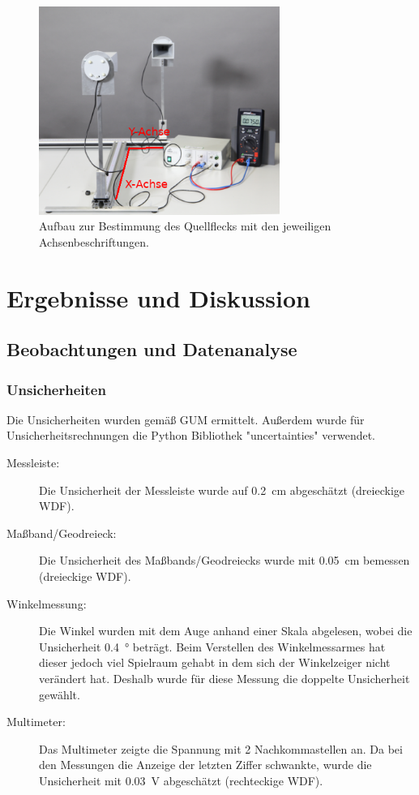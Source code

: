 \documentclass[
	a4paper,
	12pt,
	pagesize,
	ngerman
]{scrartcl}
\begin{document}
	\begin{figure}[H] 
		\includegraphics[width=0.7\textwidth]{MikrowellenMitAchsen}
		\centering
		\caption{Aufbau zur Bestimmung des Quellflecks mit den jeweiligen Achsenbeschriftungen.}
		\label{fig_mikrowellenmitachsen}
		\centering
	\end{figure}
	
	\section{Ergebnisse und Diskussion}
	

	\subsection{Beobachtungen und Datenanalyse}
	\subsubsection{Unsicherheiten} %
	Die Unsicherheiten wurden gemäß GUM ermittelt. 
	Außerdem wurde für Unsicherheitsrechnungen die Python Bibliothek "uncertainties" verwendet.
	\begin{description}
		\item[Messleiste:] Die Unsicherheit der Messleiste wurde auf \SI{0,2}{cm} abgeschätzt (dreieckige WDF).
		\item[Maßband/Geodreieck:] Die Unsicherheit des Maßbands/Geodreiecks wurde mit \SI{0,05}{cm} bemessen (dreieckige WDF).
		\item[Winkelmessung:]  Die Winkel wurden mit dem Auge anhand einer Skala abgelesen, wobei die Unsicherheit \SI{0,4}{\degree} beträgt. Beim Verstellen des Winkelmessarmes hat dieser jedoch viel Spielraum gehabt in dem sich der Winkelzeiger nicht verändert hat. Deshalb wurde für diese Messung die doppelte Unsicherheit gewählt.
		\item[Multimeter:] Das Multimeter zeigte die Spannung mit 2 Nachkommastellen an. Da bei den Messungen die Anzeige der letzten Ziffer schwankte, wurde die Unsicherheit mit \SI{0,03}{V} abgeschätzt (rechteckige WDF).
	\end{description}
\end{document}

